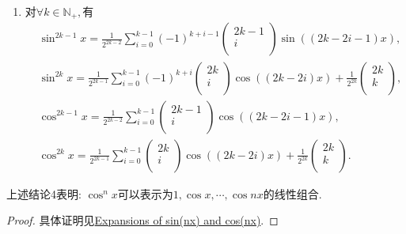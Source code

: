 \documentclass[../../main.tex]{subfiles}%
\begin{document}
\begin{theorem}
\begin{enumerate}
\item 对$\forall k\in \mathbb{N} _+,$有
\begin{align*}
&\sin ^{2k-1}x=\frac{1}{2^{2k-2}}\sum_{i=0}^{k-1}{\left( -1 \right) ^{k+i-1}\left( \begin{array}{c}
2k-1\\
i\\
\end{array} \right) \sin \left( \left( 2k-2i-1 \right) x \right)},
\\
&\sin ^{2k}x=\frac{1}{2^{2k-1}}\sum_{i=0}^{k-1}{\left( -1 \right) ^{k+i}\left( \begin{array}{c}
2k\\
i\\
\end{array} \right) \cos \left( \left( 2k-2i \right) x \right)}+\frac{1}{2^{2k}}\left( \begin{array}{c}
2k\\
k\\
\end{array} \right) ,
\\
&\cos ^{2k-1}x=\frac{1}{2^{2k-2}}\sum_{i=0}^{k-1}{\left( \begin{array}{c}
2k-1\\
i\\
\end{array} \right) \cos \left( \left( 2k-2i-1 \right) x \right)},
\\
&\cos ^{2k}x=\frac{1}{2^{2k-1}}\sum_{i=0}^{k-1}{\left( \begin{array}{c}
2k\\
i\\
\end{array} \right) \cos \left( \left( 2k-2i \right) x \right)}+\frac{1}{2^{2k}}\left( \begin{array}{c}
2k\\
k\\
\end{array} \right) .
\end{align*}

\end{enumerate}
\end{theorem}
\begin{note}
上述结论4表明:
$\cos ^nx$可以表示为$1,\cos x,\cdots,\cos nx$的线性组合.
\end{note}
\begin{proof}

具体证明见\href{https://brilliant.org/wiki/expansions-of-certain-trigonometric-functions/}{Expansions of sin(nx) and cos(nx)}.






\end{proof}
\end{document}

